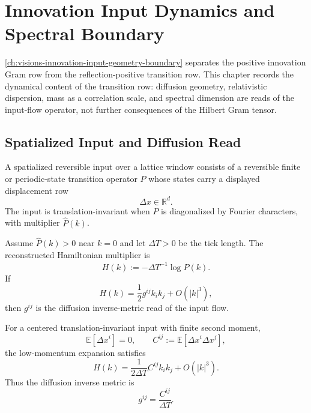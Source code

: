 \chapter{Innovation Input Dynamics and Spectral Boundary}
\label{ch:visions-innovation-input-dynamics-spectral-boundary}

\autoref{ch:visions-innovation-input-geometry-boundary} separates the
positive innovation Gram row from the reflection-positive transition row.
This chapter records the dynamical content of the transition row: diffusion
geometry, relativistic dispersion, mass as a correlation scale, and spectral
dimension are reads of the input-flow operator, not further consequences of
the Hilbert Gram tensor.

\section{Spatialized Input and Diffusion Read}
\label{sec:innovation-input-dynamics-diffusion-read}

\begin{definition}
\label{def:innovation-input-dynamics-spatialized-input}
A spatialized reversible input over a lattice window consists of a reversible
finite or periodic-state transition operator $P$ whose states carry a
displayed displacement row
$$
\Delta x\in\mathbb R^d.
$$
The input is translation-invariant when $P$ is diagonalized by Fourier
characters, with multiplier $\widehat P(k)$.
\end{definition}

\begin{definition}
\label{def:innovation-input-dynamics-diffusion-inverse-metric}
Assume $\widehat P(k)>0$ near $k=0$ and let $\Delta T>0$ be the tick
length. The reconstructed Hamiltonian multiplier is
$$
H(k):=-\Delta T^{-1}\log\widehat P(k).
$$
If
$$
H(k)=\frac12g^{ij}k_ik_j+O(|k|^3),
$$
then $g^{ij}$ is the diffusion inverse-metric read of the input flow.
\end{definition}

\begin{theorem}
\label{thm:innovation-input-dynamics-low-momentum-meeting}
For a centered translation-invariant input with finite second moment,
$$
\mathbb E[\Delta x^i]=0,
\qquad
C^{ij}:=\mathbb E[\Delta x^i\Delta x^j],
$$
the low-momentum expansion satisfies
$$
H(k)=\frac{1}{2\Delta T}C^{ij}k_ik_j+O(|k|^3).
$$
Thus the diffusion inverse metric is
$$
g^{ij}=\frac{C^{ij}}{\Delta T}.
$$
\end{theorem}

